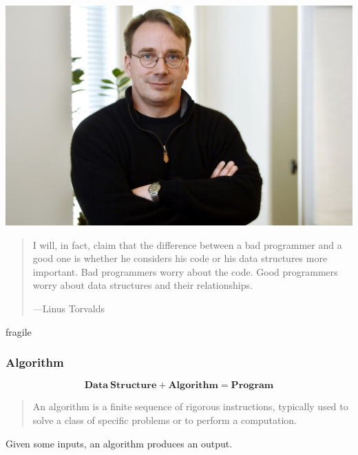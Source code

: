 \documentclass[aspectratio=169, 14pt]{beamer}
\begin{document}
\begin{frame}
	\begin{center}
		\includegraphics[height=.35\paperheight]{week0/linux}
	\end{center}
	\begin{quote}
		I will, in fact, claim that the difference between a bad programmer and a good one is whether he considers his code or his data structures more important. Bad programmers worry about the code. Good programmers worry about data structures and their relationships.
		\begin{flushright}
			---Linus Torvalds
		\end{flushright}
	\end{quote}
\end{frame}

\begin{frame}{fragile}
	\frametitle{Algorithm}

	$$\mathbf{Data\ Structure + Algorithm = Program}$$

	\begin{quote}
		An algorithm is a finite sequence of rigorous instructions, typically used to solve a class of specific problems or to perform a computation.
	\end{quote}

	Given some \alert{inputs}, an algorithm produces an \alert{output}.


\end{frame}
\end{document}
